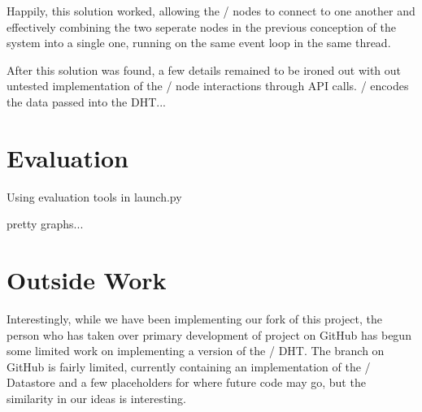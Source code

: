 \documentclass[11pt,twocolumn]{article}
\begin{document}
Happily, this solution worked, allowing the \Entangled/ nodes to connect to one another and effectively combining the two seperate nodes in the previous conception of the system into a single one, running on the same event loop in the same thread.

After this solution was found, a few details remained to be ironed out with out untested implementation of the \Entangled/ node interactions through API calls. \Entangled/ encodes the data passed into the DHT...






\section{Evaluation}
Using evaluation tools in launch.py

pretty graphs...






\section{Outside Work}
Interestingly, while we have been implementing our fork of this project, the person who has taken over primary development of project on GitHub has begun some limited work on implementing a version of the \Kademlia/ DHT.
The branch on GitHub is fairly limited, currently containing an implementation of the \Kademlia/ Datastore and a few placeholders for where future code may go, but the similarity in our ideas is interesting.






\end{document}
